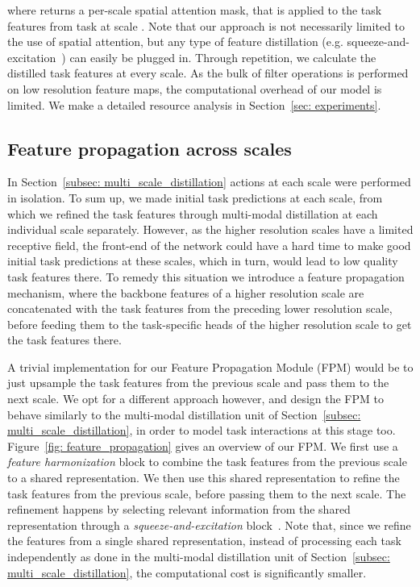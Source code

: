 \documentclass[runningheads]{llncs}
\begin{document}
where  returns a per-scale spatial attention mask, that is applied to the task features  from task  at scale . Note that our approach is not necessarily limited to the use of spatial attention, but any type of feature distillation (e.g. squeeze-and-excitation~\cite{hu2018squeeze}) can easily be plugged in. Through repetition, we calculate the distilled task features at every scale. As the bulk of filter operations is performed on low resolution feature maps, the computational overhead of our model is limited. We make a detailed resource analysis in Section~\ref{sec: experiments}.

\subsection{Feature propagation across scales}
\label{subsec: feature_propagation}
In Section~\ref{subsec: multi_scale_distillation} actions at each scale were performed in isolation. To sum up, we made initial task predictions at each scale, from which we refined the task features through multi-modal distillation at each individual scale separately. However, as the higher resolution scales have a limited receptive field, the front-end of the network could have a hard time to make good initial task predictions at these scales, which in turn, would lead to low quality task features there. To remedy this situation we introduce a feature propagation mechanism, where the backbone features of a higher resolution scale are concatenated with the task features from the preceding lower resolution scale, before feeding them to the task-specific heads of the higher resolution scale to get the task features there.

A trivial implementation for our Feature Propagation Module (FPM) would be to just upsample the task features from the previous scale and pass them to the next scale. We opt for a different approach however, and design the FPM to behave similarly to the multi-modal distillation unit of Section~\ref{subsec: multi_scale_distillation}, in order to model task interactions at this stage too. Figure~\ref{fig: feature_propagation} gives an overview of our FPM. We first use a \textit{feature harmonization} block to combine the task features from the previous scale to a shared representation. We then use this shared representation to refine the task features from the previous scale, before passing them to the next scale. The refinement happens by selecting relevant information from the shared representation through a \textit{squeeze-and-excitation} block~\cite{hu2018squeeze}. Note that, since we refine the features from a single shared representation, instead of processing each task independently as done in the multi-modal distillation unit of Section~\ref{subsec: multi_scale_distillation}, the computational cost is significantly smaller.
\end{document}
